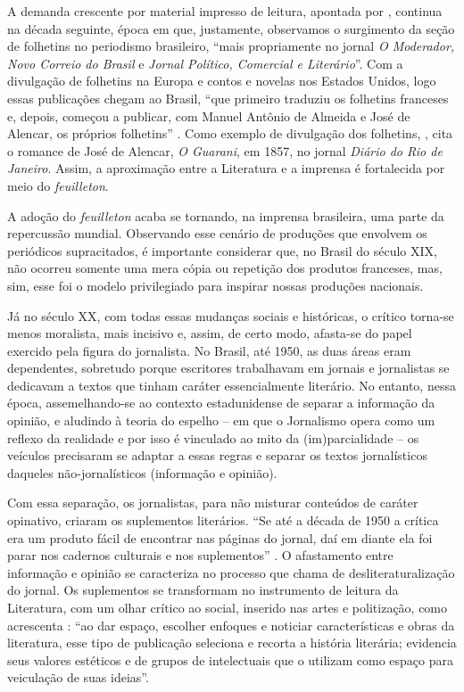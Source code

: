 \documentclass[portuguese]{textolivre}
\begin{document}
A demanda crescente por material impresso de leitura, apontada por \textcite[p. 89]{soares2014}, continua na década seguinte, época em que, justamente, observamos o surgimento da seção de folhetins no periodismo brasileiro, “mais propriamente no jornal \textit{O Moderador, Novo Correio do Brasil} e \textit{Jornal Político, Comercial e Literário}”. Com a divulgação de folhetins na Europa e contos e novelas nos Estados Unidos, logo essas publicações chegam ao Brasil, “que primeiro traduziu os folhetins franceses e, depois, começou a publicar, com Manuel Antônio de Almeida e José de Alencar, os próprios folhetins” \cite[p. 09]{arnt2001}. Como exemplo de divulgação dos folhetins, \textcite{meyer1996}, cita o romance de José de Alencar, \textit{O Guarani}, em 1857, no jornal \textit{Diário do Rio de Janeiro}. Assim, a aproximação entre a Literatura e a imprensa é fortalecida por meio do \textit{feuilleton}.

A adoção do \textit{feuilleton} acaba se tornando, na imprensa brasileira, uma parte da repercussão mundial. Observando esse cenário de produções que envolvem os periódicos supracitados, é importante considerar que, no Brasil do século XIX, não ocorreu somente uma mera cópia ou repetição dos produtos franceses, mas, sim, esse foi o modelo privilegiado para inspirar nossas produções nacionais.

Já no século XX, com todas essas mudanças sociais e históricas, o crítico torna-se menos moralista, mais incisivo e, assim, de certo modo, afasta-se do papel exercido pela figura do jornalista. No Brasil, até 1950, as duas áreas eram dependentes, sobretudo porque escritores trabalhavam em jornais e jornalistas se dedicavam a textos que tinham caráter essencialmente literário. No entanto, nessa época, assemelhando-se ao contexto estadunidense de separar a informação da opinião, e aludindo à teoria do espelho – em que o Jornalismo opera como um reflexo da realidade e por isso é vinculado ao mito da (im)parcialidade – os veículos precisaram se adaptar a essas regras e separar os textos jornalísticos daqueles não-jornalísticos (informação e opinião).

Com essa separação, os jornalistas, para não misturar conteúdos de caráter opinativo, criaram os suplementos literários. “Se até a década de 1950 a crítica era um produto fácil de encontrar nas páginas do jornal, daí em diante ela foi parar nos cadernos culturais e nos suplementos” \cite[p. 40]{lima2013}. O afastamento entre informação e opinião se caracteriza no processo que \textcite[p. 13]{santiago1993critica} chama de desliteraturalização do jornal. Os suplementos se transformam no instrumento de leitura da Literatura, com um olhar crítico ao social, inserido nas artes e politização, como acrescenta \textcite[p. 157]{lima2013}: “ao dar espaço, escolher enfoques e noticiar características e obras da literatura, esse tipo de publicação seleciona e recorta a história literária; evidencia seus valores estéticos e de grupos de intelectuais que o utilizam como espaço para veiculação de suas ideias”.
\end{document}
